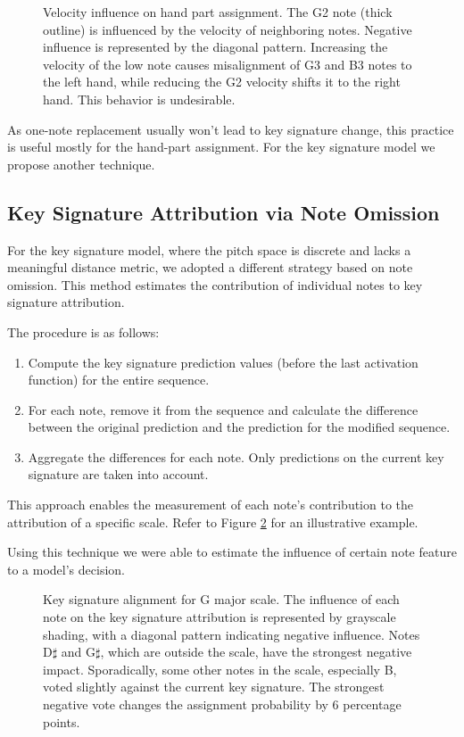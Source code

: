 \begin{figure}[ht!] \centering  \caption[Velocity influence on hand part assignment.]{Velocity influence on hand part assignment. The G2 note (thick outline) is influenced by the velocity of neighboring notes. Negative influence is represented by the diagonal pattern. Increasing the velocity of the low note causes misalignment of G3 and B3 notes to the left hand, while reducing the G2 velocity shifts it to the right hand. This behavior is undesirable.} \label{hand_part_misalignment} \end{figure}

As one-note replacement usually won't lead to key signature change, this practice is useful mostly for the hand-part assignment. For the key signature model we propose another technique.

\subsection{Key Signature Attribution via Note Omission}

For the key signature model, where the pitch space is discrete and lacks a meaningful distance metric, we adopted a different strategy based on note omission. This method estimates the contribution of individual notes to key signature attribution.

The procedure is as follows: \begin{enumerate}
	\item Compute the key signature prediction values (before the last activation function) for the entire sequence.
	\item For each note, remove it from the sequence and calculate the difference between the original prediction and the prediction for the modified sequence.
	\item Aggregate the differences for each note. Only predictions on the current key signature are taken into account.
	\end{enumerate} This approach enables the measurement of each note's contribution to the attribution of a specific scale. Refer to Figure \ref{note_removing} for an illustrative example.
	
Using this technique we were able to estimate the influence of certain note feature to a model's decision.

\begin{figure}[ht!] \centering  \caption[Key signature alignment for G major scale.]{Key signature alignment for G major scale. The influence of each note on the key signature attribution is represented by grayscale shading, with a diagonal pattern indicating negative influence. Notes D$\sharp$ and G$\sharp$, which are outside the scale, have the strongest negative impact. Sporadically, some other notes in the scale, especially B, voted slightly against the current key signature. The strongest negative vote changes the assignment probability by $6$ percentage points.}
\label{note_removing}\end{figure}
